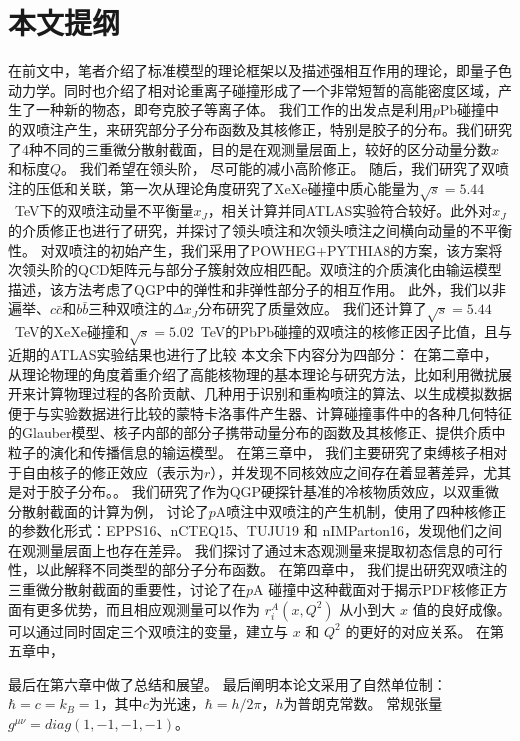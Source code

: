 \section{本文提纲}

		在前文中，笔者介绍了标准模型的理论框架以及描述强相互作用的理论，即量子色动力学。同时也介绍了相对论重离子碰撞形成了一个非常短暂的高能密度区域，产生了一种新的物态，即夸克胶子等离子体。
		我们工作的出发点是利用$p$Pb碰撞中的双喷注产生，来研究部分子分布函数及其核修正，特别是胶子的分布。我们研究了4种不同的三重微分散射截面，目的是在观测量层面上，较好的区分动量分数$x$和标度$Q$。
	我们希望在领头阶，
		尽可能的减小高阶修正。
		随后，我们研究了双喷注的压低和关联，第一次从理论角度研究了XeXe碰撞中质心能量为$\sqrt{s}=5.44$~TeV下的双喷注动量不平衡量$x_J$，相关计算并同ATLAS实验符合较好。此外对$x_J$的介质修正也进行了研究，并探讨了领头喷注和次领头喷注之间横向动量的不平衡性。
		对双喷注的初始产生，我们采用了POWHEG+PYTHIA8的方案，该方案将次领头阶的QCD矩阵元与部分子簇射效应相匹配。双喷注的介质演化由输运模型描述，该方法考虑了QGP中的弹性和非弹性部分子的相互作用。
		此外，我们以非遍举、$c\bar{c}$和$b\bar{b}$三种双喷注的$\Delta x_J$分布研究了质量效应。
		我们还计算了$\sqrt{s}=5.44$~TeV的XeXe碰撞和$\sqrt{s}=5.02$~TeV的PbPb碰撞的双喷注的核修正因子比值，且与近期的ATLAS实验结果也进行了比较
	本文余下内容分为四部分：
	在第二章中，
		从理论物理的角度着重介绍了高能核物理的基本理论与研究方法，比如利用微扰展开来计算物理过程的各阶贡献、几种用于识别和重构喷注的算法、以生成模拟数据便于与实验数据进行比较的蒙特卡洛事件产生器、计算碰撞事件中的各种几何特征的Glauber模型、核子内部的部分子携带动量分布的函数及其核修正、提供介质中粒子的演化和传播信息的输运模型。
	在第三章中，
		我们主要研究了束缚核子相对于自由核子的修正效应（表示为$r$），并发现不同核效应之间存在着显著差异，尤其是对于胶子分布。。
		我们研究了作为QGP硬探针基准的冷核物质效应，以双重微分散射截面的计算为例，
		讨论了$p$A喷注中双喷注的产生机制，使用了四种核修正的参数化形式：EPPS16、nCTEQ15、TUJU19 和 nIMParton16，发现他们之间在观测量层面上也存在差异。
		我们探讨了通过末态观测量来提取初态信息的可行性，以此解释不同类型的部分子分布函数。
	在第四章中，
		我们提出研究双喷注的三重微分散射截面的重要性，讨论了在$p$A 碰撞中这种截面对于揭示PDF核修正方面有更多优势，而且相应观测量可以作为 $r^A_i(x,Q^2)$ 从小到大 $x$ 值的良好成像。
		可以通过同时固定三个双喷注的变量，建立与 $x$ 和 $Q^2$ 的更好的对应关系。
	在第五章中，
	


	最后在第六章中做了总结和展望。
	最后阐明本论文采用了自然单位制：$\hbar = c = k_B = 1$，其中$c$为光速，$\hbar = h/2\pi$，$h$为普朗克常数。
	常规张量$g^{\mu\nu} = diag(1,-1,-1,-1)$。


